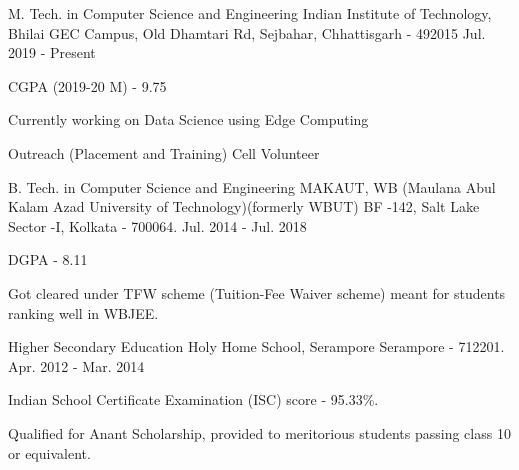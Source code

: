 


\begin{cventries}


\cventry
{M. Tech.  in Computer Science and Engineering} %
{Indian Institute of Technology, Bhilai} %
{GEC Campus, Old Dhamtari Rd, Sejbahar, Chhattisgarh - 492015} %
{Jul. 2019 - Present} %
{ %
\begin{cvitems}
\item {CGPA (2019-20 M) - 9.75}
\item {Currently working on Data Science using Edge Computing}
\item {Outreach (Placement and Training) Cell Volunteer}
\end{cvitems}
}


\cventry
{B. Tech.  in Computer Science and Engineering} %
{MAKAUT, WB (Maulana Abul Kalam Azad University of Technology)\newline (formerly WBUT)} %
{BF -142, Salt Lake Sector -I, \newline
Kolkata - 700064.} %
{Jul. 2014 - Jul. 2018} %
{ %
\begin{cvitems}
\item {DGPA - 8.11}
\item {Got cleared under TFW scheme (Tuition-Fee Waiver scheme) meant for students ranking well in WBJEE.}
\end{cvitems}
}


\cventry
{Higher Secondary Education} %
{Holy Home School, Serampore} %
{Serampore - 712201.} %
{Apr. 2012 - Mar. 2014} %
{ %
\begin{cvitems}
\item {Indian School Certificate Examination (ISC) score - 95.33\%.}
\item {Qualified for Anant Scholarship, provided to meritorious students passing class 10 or equivalent.}
\end{cvitems}
}


\end{cventries}

